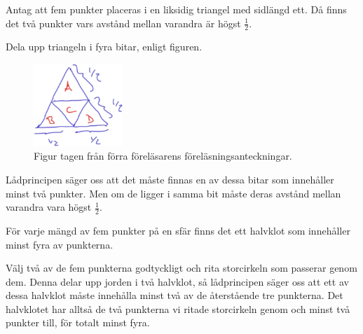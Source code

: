 \documentclass[nobib]{tufte-handout}
\begin{document}
\begin{example}
  Antag att fem punkter placeras i en liksidig triangel med sidlängd ett. Då finns det två punkter vars avstånd mellan varandra är högst $\frac{1}{2}$.

  Dela upp triangeln i fyra bitar, enligt figuren.
  \begin{figure}
    \centering
    \includegraphics[width = 0.3\textwidth]{graphics/pigeonhole_principle_equilat_triangle.png}
    \caption{Figur tagen från förra föreläsarens föreläsningsanteckningar.}
  \end{figure}
  Lådprincipen säger oss att det måste finnas en av dessa bitar som innehåller minst två punkter. Men om de ligger i samma bit måste deras avstånd mellan varandra vara högst $\frac{1}{2}$.
\end{example}

\begin{example}
  För varje mängd av fem punkter på en sfär finns det ett halvklot som innehåller minst fyra av punkterna.

  Välj två av de fem punkterna godtyckligt och rita storcirkeln som passerar genom dem. Denna delar upp jorden i två halvklot, så lådprincipen säger oss att ett av dessa halvklot måste innehålla minst två av de återstående tre punkterna. Det halvklotet har alltså de två punkterna vi ritade storcirkeln genom och minst två punkter till, för totalt minst fyra.
\end{example}
\end{document}
